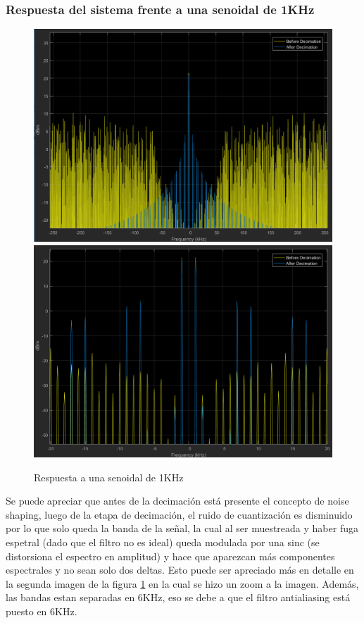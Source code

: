 \documentclass[assd_tp3_main.tex]{subfiles}
\begin{document}
\subsubsection{Respuesta del sistema frente a una senoidal de 1KHz}
\begin{figure}[H]
\centering
\includegraphics[width=0.7\linewidth]{images/ej4/sin_response_1K.png}
\includegraphics[width=0.7\linewidth]{images/ej4/sin_response_1K_zoom.png}
\caption{Respuesta a una senoidal de 1KHz}
\label{fig:sin_response_1K}
\end{figure}
Se puede apreciar que antes de la decimación está presente el concepto de noise shaping, luego de la etapa de decimación, el ruido de cuantización es disminuido por lo que solo queda la banda de la señal, la cual al ser muestreada y haber fuga espetral (dado que el filtro no es ideal) queda modulada por una sinc (se distorsiona el espectro en amplitud) y hace que aparezcan más componentes espectrales y no sean solo dos deltas. Esto puede ser apreciado más en detalle en la segunda imagen de la figura \ref{fig:sin_response_1K} en la cual se hizo un zoom a la imagen. Además, las bandas estan separadas en 6KHz, eso se debe a que el filtro antialiasing está puesto en 6KHz.
\end{document}
